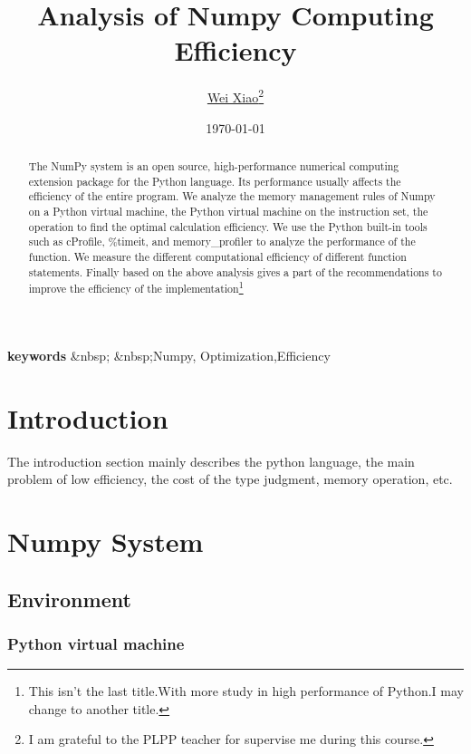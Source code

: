 \documentclass[12pt,a4paper]{article}
\begin{document}
\title{Analysis of Numpy Computing Efficiency}

\author{\href{http://awy.ink/contact}{Wei Xiao}\thanks{I am grateful to the PLPP teacher for supervise me during this course.}}

\date{\small \today}

\maketitle

\begin{abstract}

The NumPy system is an open source, high-performance numerical computing extension package for the Python language.
 Its performance usually affects the efficiency of the entire program. 
 We analyze the memory management rules of Numpy on a Python virtual machine, the Python virtual machine on the instruction set, the operation to find the optimal calculation efficiency.
We use the Python built-in tools such as cProfile, \%timeit, and memory\_profiler to analyze the performance of the function. We measure the different computational efficiency of different function statements.
Finally based on the above analysis gives a part of the recommendations to improve the efficiency of the implementation\footnote{This isn't the last title.With more study in high performance of Python.I may change to another title.}
\end{abstract}


\large\textbf{keywords} &nbsp;{ &nbsp;Numpy, Optimization,Efficiency}
\newpage

\section{Introduction}
The introduction section mainly describes the python language, the main problem of low efficiency, the cost of the type judgment, memory operation, etc.

\section{Numpy System}

\subsection{Environment}

\subsubsection{Python virtual machine}
\end{document}
